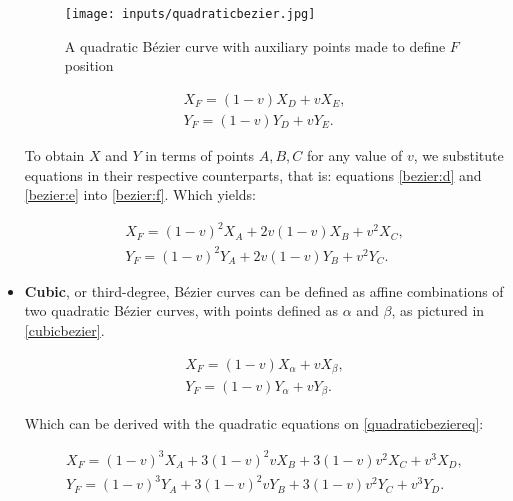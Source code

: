 \documentclass[cic,tc,english]{iiufrgs}
\begin{document}
\begin{itemize}
\begin{figure}[h!]
    \caption{A quadratic Bézier curve with auxiliary points made to define $F$ position}
    \begin{center}
        \texttt{[image: inputs/quadraticbezier.jpg]}
    \end{center}
    \label{quadraticbezier2}
\end{figure}

\begin{equation}
    \begin{array}{c}
        {X_F} = (1-v){X_D} + v{X_E},  \\
        {Y_F} = (1-v){Y_D} + v{Y_E}.
    \end{array}
    \label{bezier:f}
\end{equation}

To obtain $X$ and $Y$ in terms of points $A,B,C$ for any value of $v$, we substitute equations in their respective counterparts, that is: equations  \cref{bezier:d} and \cref{bezier:e} into \cref{bezier:f}. Which yields:

\begin{equation}
    \begin{array}{c}
    {X_F} = (1-v)^2{X_A} + 2v(1-v){X_B} + v^2{X_C}, \\
    {Y_F} = (1-v)^2{Y_A} + 2v(1-v){Y_B} + v^2{Y_C}.
    \end{array}
    \label{quadraticbeziereq}
\end{equation}



\item \textbf{Cubic}, or third-degree, Bézier curves can be defined as affine combinations of two quadratic Bézier curves, with points defined as $\alpha$ and $\beta$, as pictured in  \cref{cubicbezier}.

\begin{equation}
    \begin{array}{c}
    {X_F} = (1-v){X_\alpha} + v{X_\beta}, \\
    {Y_F} = (1-v){Y_\alpha} + v{Y_\beta}.
    \end{array}
\end{equation}

Which can be derived with the quadratic equations on \ref{quadraticbeziereq}:

\begin{equation}
    \begin{array}{c}
    {X_F} = (1-v)^3{X_A} + 3(1-v)^2v{X_B} + 3(1-v)v^2{X_C} + v^3{X_D}, \\
    {Y_F} = (1-v)^3{Y_A} + 3(1-v)^2v{Y_B} + 3(1-v)v^2{Y_C} + v^3{Y_D}.
    \end{array}
\end{equation}


\end{itemize}
\end{document}
